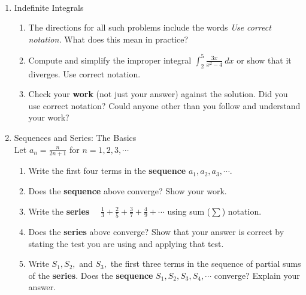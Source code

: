 \documentclass[11pt,fleqn]{article}
\begin{document}
\renewcommand{\headrulewidth}{0pt}
\newcommand{\blank}[1]{\rule{#1}{0.75pt}}
\newcommand{\bc}{\begin{center}}
\newcommand{\ec}{\end{center}}
\renewcommand{\d}{\displaystyle}

\vspace*{-0.7in}

\begin{center}
  \large
  \\
   
\end{center}
\begin{enumerate}
\item Indefinite Integrals
	\begin{enumerate}
	\item The directions for all such problems include the words \emph{Use correct notation.} What does this mean in practice?
	\item Compute and simplify the improper integral $\d \int_2^5 \frac{3x}{x^2-4} \: dx$ or show that it diverges. Use correct notation.
	\item Check your \textbf{work} (not just your answer) against the solution. Did you use correct notation? Could anyone other than you follow and understand your work?
	\end{enumerate}
\item Sequences and Series: The Basics\\
	
	Let $a_n=\frac{n}{2n+1}$ for $n=1,2,3,\cdots$
		\begin{enumerate}
		\item Write the first four terms in the \textbf{sequence} $a_1,a_2,a_3, \cdots.$
		\item Does the \textbf{sequence} above converge? Show your work.
		\item Write the \textbf{series} $\quad \frac{1}{3}+\frac{2}{5}+\frac{3}{7}+\frac{4}{9}+ \cdots$ using sum ($\sum$) notation.
		\item Does the \textbf{series} above converge? Show that your answer is correct by stating the test you are using and applying that test.
		\item Write $S_1, S_2,$ and $S_3,$ the first three terms in the sequence of partial sums of the \textbf{series}. Does the \textbf{sequence} $S_1, S_2, S_3, S_4, \cdots$ converge? Explain your answer.
		\end{enumerate}
	

\end{enumerate}
\end{document}
